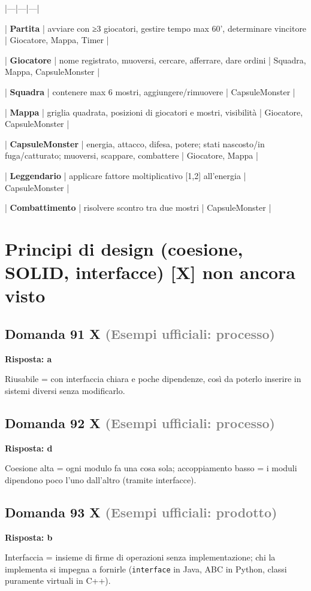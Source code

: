 \documentclass[a4paper,11pt]{article}
\begin{document}
|---|---|---|

| \textbf{Partita} | avviare con ≥3 giocatori, gestire tempo max 60', determinare vincitore | Giocatore, Mappa, Timer |

| \textbf{Giocatore} | nome registrato, muoversi, cercare, afferrare, dare ordini | Squadra, Mappa, CapsuleMonster |

| \textbf{Squadra} | contenere max 6 mostri, aggiungere/rimuovere | CapsuleMonster |

| \textbf{Mappa} | griglia quadrata, posizioni di giocatori e mostri, visibilità | Giocatore, CapsuleMonster |

| \textbf{CapsuleMonster} | energia, attacco, difesa, potere; stati nascosto/in fuga/catturato; muoversi, scappare, combattere | Giocatore, Mappa |

| \textbf{Leggendario} | applicare fattore moltiplicativo [1,2] all'energia | CapsuleMonster |

| \textbf{Combattimento} | risolvere scontro tra due mostri | CapsuleMonster |



\section{Principi di design (coesione, SOLID, interfacce) [X] non ancora visto}

\subsection*{Domanda 91 X \hfill {\small \textcolor{gray}{(Esempi ufficiali: processo)}}}
\textbf{Risposta: a}\par
Riusabile = con interfaccia chiara e poche dipendenze, così da poterlo inserire in sistemi diversi senza modificarlo.



\subsection*{Domanda 92 X \hfill {\small \textcolor{gray}{(Esempi ufficiali: processo)}}}
\textbf{Risposta: d}\par
Coesione alta = ogni modulo fa una cosa sola; accoppiamento basso = i moduli dipendono poco l'uno dall'altro (tramite interfacce).



\subsection*{Domanda 93 X \hfill {\small \textcolor{gray}{(Esempi ufficiali: prodotto)}}}
\textbf{Risposta: b}\par
Interfaccia = insieme di firme di operazioni senza implementazione; chi la implementa si impegna a fornirle (\texttt{interface} in Java, ABC in Python, classi puramente virtuali in C++).
\end{document}

